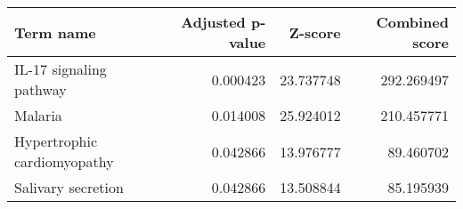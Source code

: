 \begin{tabular}{lrrr}
\toprule
                  Term name &  Adjusted p-value &   Z-score &  Combined score \\
\midrule
    IL-17 signaling pathway &          0.000423 & 23.737748 &      292.269497 \\
                    Malaria &          0.014008 & 25.924012 &      210.457771 \\
Hypertrophic cardiomyopathy &          0.042866 & 13.976777 &       89.460702 \\
         Salivary secretion &          0.042866 & 13.508844 &       85.195939 \\
\bottomrule
\end{tabular}

